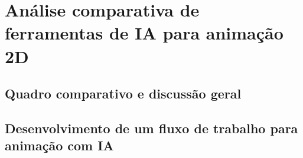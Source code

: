 \chapter{Análise comparativa de ferramentas de IA para animação 2D}
\label{c.ferramentas}



















\FloatBarrier
\section{Quadro comparativo e discussão geral}
\label{s.quadroComparativo}

\FloatBarrier
\section{Desenvolvimento de um fluxo de trabalho para animação com IA}
\label{s.pipeline}